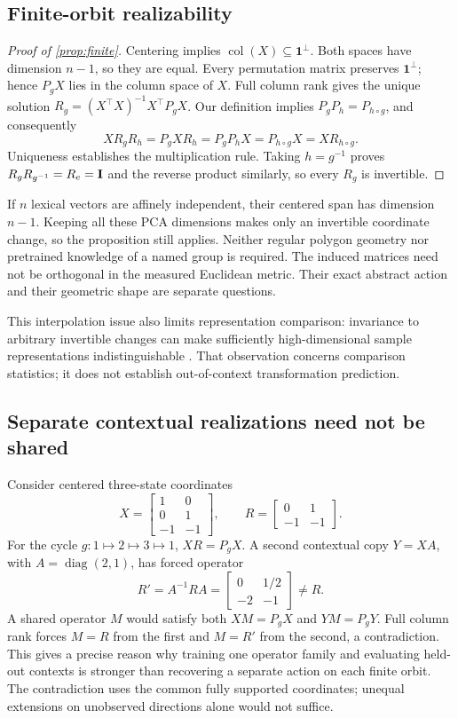 \subsection{Finite-orbit realizability}
\begin{proof}[Proof of \cref{prop:finite}]
Centering implies $\operatorname{col}(X)\subseteq\mathbf{1}^{\perp}$. Both spaces have dimension $n-1$, so they are equal. Every permutation matrix preserves $\mathbf{1}^{\perp}$; hence $P_gX$ lies in the column space of $X$. Full column rank gives the unique solution $R_g=(X^\top X)^{-1}X^\top P_gX$. Our definition implies $P_gP_h=P_{h\circ g}$, and consequently
\[
 XR_gR_h=P_gXR_h=P_gP_hX=P_{h\circ g}X=XR_{h\circ g}.
\]
Uniqueness establishes the multiplication rule. Taking $h=g^{-1}$ proves $R_gR_{g^{-1}}=R_e=\mathbf{I}$ and the reverse product similarly, so every $R_g$ is invertible.
\end{proof}
If $n$ lexical vectors are affinely independent, their centered span has dimension $n-1$. Keeping all these PCA dimensions makes only an invertible coordinate change, so the proposition still applies. Neither regular polygon geometry nor pretrained knowledge of a named group is required. The induced matrices need not be orthogonal in the measured Euclidean metric. Their exact abstract action and their geometric shape are separate questions.

This interpolation issue also limits representation comparison: invariance to arbitrary invertible changes can make sufficiently high-dimensional sample representations indistinguishable \citep{kornblith2019similarity}. That observation concerns comparison statistics; it does not establish out-of-context transformation prediction.

\subsection{Separate contextual realizations need not be shared}
Consider centered three-state coordinates
\[
 X=\begin{bmatrix}1&0\\0&1\\-1&-1\end{bmatrix},\qquad
 R=\begin{bmatrix}0&1\\-1&-1\end{bmatrix}.
\]
For the cycle $g:1\mapsto2\mapsto3\mapsto1$, $XR=P_gX$. A second contextual copy $Y=XA$, with $A=\operatorname{diag}(2,1)$, has forced operator
\[
 R'=A^{-1}RA=\begin{bmatrix}0&1/2\\-2&-1\end{bmatrix}\ne R.
\]
A shared operator $M$ would satisfy both $XM=P_gX$ and $YM=P_gY$. Full column rank forces $M=R$ from the first and $M=R'$ from the second, a contradiction. This gives a precise reason why training one operator family and evaluating held-out contexts is stronger than recovering a separate action on each finite orbit. The contradiction uses the common fully supported coordinates; unequal extensions on unobserved directions alone would not suffice.

